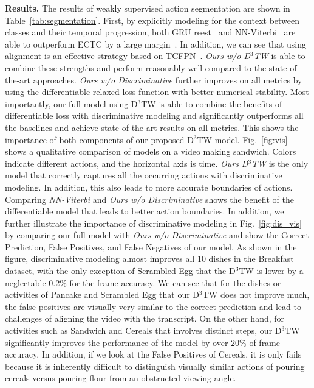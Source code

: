 \documentclass[10pt,twocolumn,letterpaper]{article}
\newcommand{\dttw}{D${}^3$TW\xspace}
\begin{document}
{\noindent \bf Results.} The results of weakly supervised action segmentation are shown in Table~\ref{tab:segmentation}. First, by explicitly modeling for the context between classes and their temporal progression, both GRU reest~\cite{richard2017weakly} and NN-Viterbi~\cite{richard2018neuralnetwork} are able to outperform ECTC by a large margin~\cite{huang2016connectionist}. In addition, we can see that using alignment is an effective strategy based on TCFPN~\cite{ding2018weakly}. \emph{Ours w/o \dttw} is able to combine these strengths and perform reasonably well compared to the state-of-the-art approaches. \emph{Ours w/o Discriminative} further improves on all metrics by using the differentiable relaxed loss function with better numerical stability. Most importantly, our full model using \dttw is able to combine the benefits of differentiable loss with discriminative modeling and significantly outperforms all the baselines and achieve state-of-the-art results on all metrics. This shows the importance of both components of our proposed \dttw model. Fig.~\ref{fig:vis} shows a qualitative comparison of models on a video making sandwich. Colors indicate different actions, and the horizontal axis is time. \emph{Ours \dttw} is the only model that correctly captures all the occurring actions with discriminative modeling. In addition, this also leads to more accurate boundaries of actions. Comparing \emph{NN-Viterbi} and \emph{Ours w/o Discriminative} shows the benefit of the differentiable model that leads to better action boundaries. 
In addition, we further illustrate the importance of discriminative modeling in Fig.~\ref{fig:dis_vis} by comparing our full model with \emph{Ours w/o Discriminative} and show the Correct Prediction, False Positives, and False Negatives of our model. As shown in the figure, discriminative modeling almost improves all 10 dishes in the Breakfast dataset, with  the only exception of Scrambled Egg that the \dttw is lower by a neglectable 0.2\% for the frame accuracy. We can see that for the dishes or activities of Pancake and Scrambled Egg that our \dttw does not improve much, the false positives are visually very similar to the correct prediction and lead to challenges of aligning the video with the transcript. On the other hand, for activities such as Sandwich and Cereals that involves distinct steps, our \dttw significantly improves the performance of the model by over 20\% of frame accuracy. In addition, if we look at the False Positives of Cereals, it is only fails because it is inherently difficult to distinguish visually similar actions of pouring cereals versus pouring flour from an obstructed viewing angle.
\end{document}
